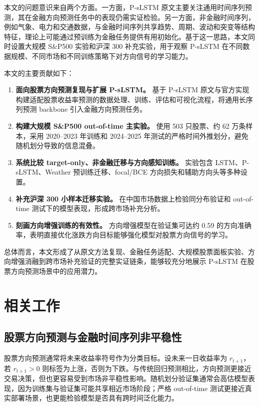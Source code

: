 \documentclass[UTF8,a4paper,twocolumn]{ctexart}
\begin{document}
本文的问题意识来自两个方面。一方面，P-sLSTM 原文主要关注通用时间序列预测，其在金融方向预测任务中的表现仍需实证检验。另一方面，非金融时间序列，例如气象、电力和交通数据，与金融时间序列共享趋势、周期、波动和突变等结构特征，理论上可能通过预训练为金融任务提供有用初始化。基于这一思路，本文同时设置大规模 S\&P500 实验和沪深 300 补充实验，用于观察 P-sLSTM 在不同数据规模、不同市场和不同训练策略下对方向信号的学习能力。

本文的主要贡献如下：

\begin{enumerate}
  \item \textbf{面向股票方向预测复现与扩展 P-sLSTM。} 基于 P-sLSTM 原文与官方实现\cite{kong2025pslstm,eleanorkong_pslstm}构建适配股票收益率预测的数据处理、训练、评估和可视化流程，将通用长序列预测 backbone 引入金融方向预测任务。
  \item \textbf{构建大规模 S\&P500 out-of-time 主实验。} 使用 503 只股票、约 62 万条样本，采用 2020--2023 年训练和 2024--2025 年测试的严格时间外推划分，避免随机划分导致的信息混叠。
  \item \textbf{系统比较 target-only、非金融迁移与方向感知训练。} 实验包含 LSTM、P-sLSTM、Weather 预训练迁移、focal/BCE 方向损失和辅助方向头等多种设置。
  \item \textbf{补充沪深 300 小样本迁移实验。} 在中国市场数据上检验同分布验证和 out-of-time 测试下的模型表现，形成跨市场补充分析。
  \item \textbf{刻画方向增强训练的有效性。} 方向增强模型在验证集可达约 0.59 的方向准确率，表明直接优化涨跌方向目标能够强化模型对股票方向信号的学习。
\end{enumerate}

总体而言，本文形成了从原文方法复现、金融任务适配、大规模股票面板实验、方向增强消融到跨市场补充验证的完整实证链条，能够较充分地展示 P-sLSTM 在股票方向预测场景中的应用潜力。

\section{相关工作}

\subsection{股票方向预测与金融时间序列非平稳性}

股票方向预测通常将未来收益率符号作为分类目标。设未来一日收益率为 $r_{t+1}$，若 $r_{t+1}>0$ 则标签为上涨，否则为下跌。与传统回归预测相比，方向预测更接近交易决策，但也更容易受到市场非平稳性影响。随机划分验证集通常会高估模型表现，因为训练集与验证集可能共享相近市场阶段；严格 out-of-time 测试更接近真实部署场景，也更能检验模型是否具有跨时间泛化能力。
\end{document}
